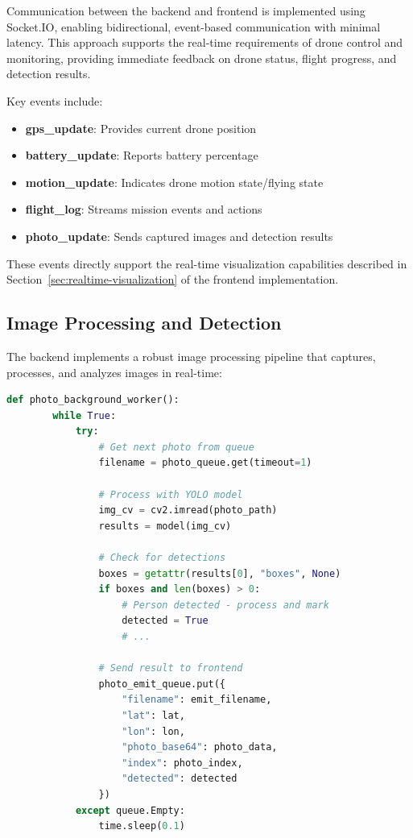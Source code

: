     Communication between the backend and frontend is implemented using Socket.IO, enabling bidirectional, event-based communication with minimal latency. This approach supports the real-time requirements of drone control and monitoring, providing immediate feedback on drone status, flight progress, and detection results.
    
    Key events include:
    
    \begin{itemize}
        \item \textbf{gps\_update}: Provides current drone position
        \item \textbf{battery\_update}: Reports battery percentage
        \item \textbf{motion\_update}: Indicates drone motion state/flying state
        \item \textbf{flight\_log}: Streams mission events and actions
        \item \textbf{photo\_update}: Sends captured images and detection results
    \end{itemize}
    
    These events directly support the real-time visualization capabilities described in Section~\ref{sec:realtime-visualization} of the frontend implementation.
    
    \subsection{Image Processing and Detection}
    
    The backend implements a robust image processing pipeline that captures, processes, and analyzes images in real-time:
    
    \begin{lstlisting}[language=Python]
    def photo_background_worker():
        while True:
            try:
                # Get next photo from queue
                filename = photo_queue.get(timeout=1)
                
                # Process with YOLO model
                img_cv = cv2.imread(photo_path)
                results = model(img_cv)
                
                # Check for detections
                boxes = getattr(results[0], "boxes", None)
                if boxes and len(boxes) > 0:
                    # Person detected - process and mark
                    detected = True
                    # ...
                
                # Send result to frontend
                photo_emit_queue.put({
                    "filename": emit_filename,
                    "lat": lat,
                    "lon": lon,
                    "photo_base64": photo_data,
                    "index": photo_index,
                    "detected": detected
                })
            except queue.Empty:
                time.sleep(0.1)
    \end{lstlisting}
    

